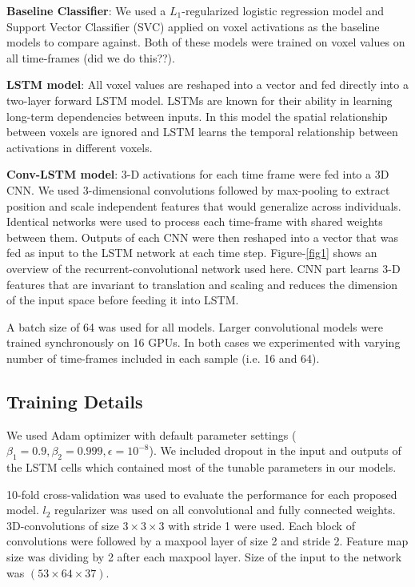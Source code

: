 \documentclass{article} %
\begin{document}
\textbf{Baseline Classifier}: We used a $L_1$-regularized logistic regression model and Support Vector Classifier (SVC) applied on voxel activations as the baseline models to compare against. Both of these models were trained on voxel values on all time-frames (did we do this??). 

\textbf{LSTM model}: All voxel values are reshaped into a vector and fed directly into a two-layer forward LSTM model. LSTMs are known for their ability in learning long-term dependencies between inputs. In this model the spatial relationship between voxels are ignored and LSTM learns the temporal relationship between activations in different voxels. 

\textbf{Conv-LSTM model}: 3-D activations for each time frame were fed into a 3D CNN. We used 3-dimensional convolutions followed by max-pooling to extract position and scale independent features that would generalize across individuals. Identical networks were used to process each time-frame with shared weights between them. Outputs of each CNN were then reshaped into a vector that was fed as input to the LSTM network at each time step. Figure-\ref{fig1} shows an overview of the recurrent-convolutional network used here. CNN part learns 3-D features that are invariant to translation and scaling and reduces the dimension of the input space before feeding it into LSTM. 


A batch size of 64 was used for all models. Larger convolutional models were trained synchronously on 16 GPUs. In both cases we experimented with varying number of time-frames included in each sample (i.e. 16 and 64).

\subsection{Training Details}
\label{training_details}
We used Adam optimizer with default parameter settings ($\beta_1=0.9, \beta_2=0.999, \epsilon=10^{-8}$). We included dropout in the input and outputs of the LSTM cells \citep{Zaremba2014} which contained most of the tunable parameters in our models. 

10-fold cross-validation was used to evaluate the performance for each proposed model. $l_2$ regularizer was used on all convolutional and fully connected weights. 
3D-convolutions of size $3\times3\times3$ with stride 1 were used. Each block of convolutions were followed by a maxpool layer of size 2 and stride 2. Feature map size was dividing by 2 after each maxpool layer. Size of the input to the network was $(53\times64\times37)$.
\end{document}
